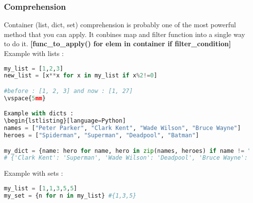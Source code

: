 \documentclass[a4paper, 12pt, titlepage]{scrartcl} %
\begin{document}
\subsubsection{Comprehension}
\label{Comprehension}
Container (list, dict, set) comprehension is probably one of the most powerful method that you can apply. It conbines map and filter function into a single way to do it. \textbf{[func\_to\_apply() for elem in container if filter\_condition]} \\

Example with lists :
\begin{lstlisting}[language=Python]
my_list = [1,2,3]
new_list = [x**x for x in my_list if x%2!=0]

#before : [1, 2, 3] and now : [1, 27]
\vspace{5mm}

Example with dicts :
\begin{lstlisting}[language=Python]
names = ["Peter Parker", "Clark Kent", "Wade Wilson", "Bruce Wayne"]
heroes = ["Spiderman", "Superman", "Deadpool", "Batman"]

my_dict = {name: hero for name, hero in zip(names, heroes) if name != "Peter Parker"}
# {'Clark Kent': 'Superman', 'Wade Wilson': 'Deadpool', 'Bruce Wayne': 'Batman'}
\end{lstlisting} \vspace{5mm}

Example with sets :
\begin{lstlisting}[language=Python]
my_list = [1,1,3,5,5]
my_set = {n for n in my_list} #{1,3,5}
\end{lstlisting} \vspace{5mm}
\end{document}
